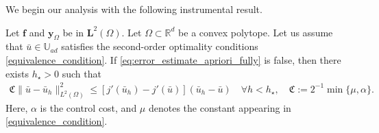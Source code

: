 \documentclass[final]{siamart0216}
\begin{document}
We begin our analysis with the following instrumental result.

\begin{lemma}\label{lemma_auxiliary_error_fd}
Let $\boldsymbol{\mathbf{f}}$ and $\mathbf{y}_{\Omega}$ be in $\mathbf{L}^2(\Omega)$. Let $\Omega \subset \mathbb{R}^d$ be a convex polytope. Let us assume that $\bar{u}\in \mathbb{U}_{ad}$ satisfies the second-order optimality conditions \eqref{equivalence_condition}. If \eqref{eq:error_estimate_apriori_fully} is false, then there exists $h_{\star}>0$ such that
\begin{align}\label{eq:auxiliary_error_estimate_fd}
\mathfrak{C}\|\bar{u}-\bar{u}_{h}\|_{L^2(\Omega)}^2\leq [j'(\bar{u}_{h})-j'(\bar{u})](\bar{u}_{h}-\bar{u})
 \quad
\forall h<h_{\star},
\quad
\mathfrak{C}:=2^{-1}\min\{\mu,\alpha\}.
\end{align}
Here, $\alpha$ is the control cost, and $\mu$ denotes the constant appearing in \eqref{equivalence_condition}.
\end{lemma}
\end{document}
